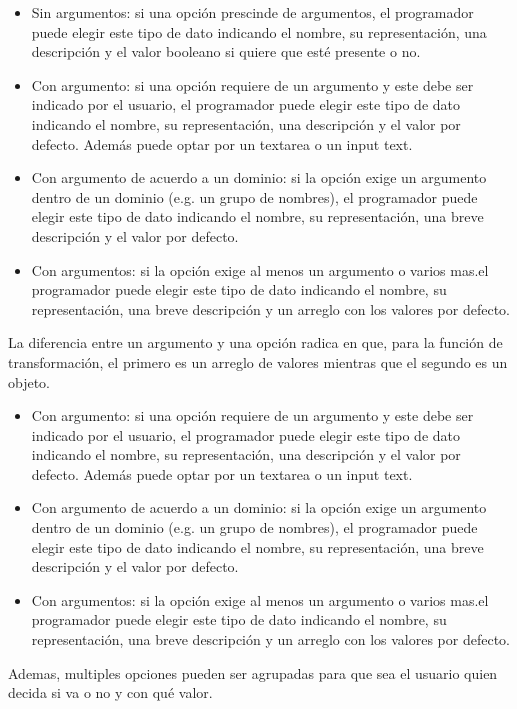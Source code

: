 \begin{itemize}
\item Sin argumentos: si una opción prescinde de argumentos, el programador puede elegir este tipo de dato indicando el nombre, su representación, una descripción y el valor booleano si quiere que esté presente o no.
\item Con argumento: si una opción requiere de un argumento y este debe ser indicado por el usuario, el programador puede elegir este tipo de dato indicando el nombre, su representación, una descripción y el valor por defecto. Además puede optar por un textarea o un input text.
\item Con argumento de acuerdo a un dominio: si la opción exige un argumento dentro de un dominio (e.g. un grupo de nombres), el programador puede elegir este tipo de dato indicando el nombre, su representación, una breve descripción  y el valor por defecto.
\item Con argumentos: si la opción exige al menos un argumento o varios mas.el programador puede elegir este tipo de dato indicando el nombre, su representación, una breve descripción y un arreglo con los valores por defecto.
\end{itemize}

La diferencia entre un argumento y una opción radica en que, para la función de transformación, el primero es un arreglo de valores mientras que el segundo es un objeto.

\begin{itemize}
\item Con argumento: si una opción requiere de un argumento y este debe ser indicado por el usuario, el programador puede elegir este tipo de dato indicando el nombre, su representación, una descripción y el valor por defecto. Además puede optar por un textarea o un input text.
\item Con argumento de acuerdo a un dominio: si la opción exige un argumento dentro de un dominio (e.g. un grupo de nombres), el programador puede elegir este tipo de dato indicando el nombre, su representación, una breve descripción  y el valor por defecto.
\item Con argumentos: si la opción exige al menos un argumento o varios mas.el programador puede elegir este tipo de dato indicando el nombre, su representación, una breve descripción y un arreglo con los valores por defecto.
\end{itemize}

Ademas, multiples opciones pueden ser agrupadas para que sea el usuario quien decida si va o no y con qué valor.

